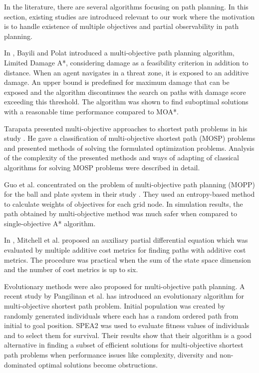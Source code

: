 \documentclass[10pt,journal]{IEEEtran}
\begin{document}
In the literature, there are several algorithms focusing on path planning. In this section, existing studies are introduced relevant to our work where the motivation is to handle existence of multiple objectives and partial observability in path planning.

In  \cite{LDAStarBayili:2008}, Bayili and Polat introduced a multi-objective path planning algorithm, Limited Damage A*,  considering damage as a feasibility criterion in addition to distance. When an agent navigates in a threat zone, it is exposed to an additive damage. An upper bound is predefined for maximum damage that can be exposed and the algorithm discontinues the search on paths with damage score exceeding this threshold. The algorithm was shown to find suboptimal solutions with a reasonable time performance compared to MOA*.

Tarapata presented multi-objective approaches to shortest path problems in his study \cite{Tarapata:2007}. He gave a classification of multi-objective shortest path (MOSP) problems and presented methods of solving the formulated optimization problems. Analysis of the complexity of the presented methods and ways of adapting of classical algorithms for solving MOSP problems were described in detail.

Guo et al. concentrated on the problem of multi-objective path planning (MOPP) for the ball and plate system in their study \cite{Guo:2009}. %
They used an entropy-based method to calculate weights of objectives for each grid node. In simulation results, the path obtained by multi-objective method was much safer when compared to single-objective A* algorithm.

In \cite{Mitchell:2009}, Mitchell et al. proposed an auxiliary partial differential equation which was evaluated by multiple additive cost metrics for finding paths with additive cost metrics. %
The procedure was practical when the sum of the state space dimension and the number of cost metrics is up to six.

Evolutionary methods were also proposed for multi-objective path planning. A recent study by Pangilinan et al. \cite{Pangilinan} has introduced an evolutionary algorithm for multi-objective shortest path problem. Initial population was created by randomly generated individuals where each has a random ordered path from initial to goal position. SPEA2 was used to evaluate fitness values of individuals and to select them for survival. Their results show that their algorithm is a good alternative in finding a subset of efficient solutions for multi-objective shortest path problems when performance issues like complexity, diversity and non-dominated optimal solutions become obstructions.
\end{document}
